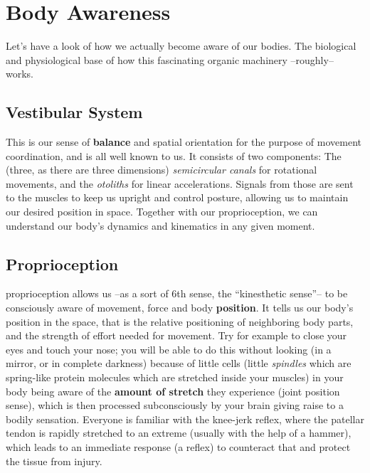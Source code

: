 \section{Body Awareness}\label{sec:body-awareness}

Let's have a look of how we actually become aware of our bodies.
The biological and physiological base of how this fascinating organic machinery --roughly-- works.

\subsection{Vestibular System}\label{subsec:vestibular-system}

This is our sense of \textbf{balance} and spatial orientation for the purpose of movement coordination, and is all well known to us.
It consists of two components: The (three, as there are three dimensions) \textit{semicircular canals} for rotational movements, and the \textit{otoliths} for linear accelerations.
Signals from those are sent to the muscles to keep us upright and control posture, allowing us to maintain our desired position in space.
Together with our proprioception, we can understand our body's dynamics and kinematics in any given moment.

\subsection{Proprioception}\label{subsec:proprioception}

\Gls{proprioception} allows us --as a sort of 6th sense, the ``kinesthetic sense''-- to be consciously aware of movement, force and body \textbf{position}.
It tells us our body's position in the space, that is the relative positioning of neighboring body parts, and the strength of effort needed for movement.
Try for example to close your eyes and touch your nose; you will be able to do this without looking (in a mirror, or in complete darkness) because of little cells (little \textit{spindles} which are spring-like protein molecules which are stretched inside your muscles) in your body being aware of the \textbf{amount of stretch} they experience (joint position sense), which is then processed subconsciously by your brain giving raise to a bodily sensation.
Everyone is familiar with the knee-jerk reflex, where the patellar tendon is rapidly stretched to an extreme (usually with the help of a hammer), which leads to an immediate response (a reflex) to counteract that and protect the tissue from injury.

